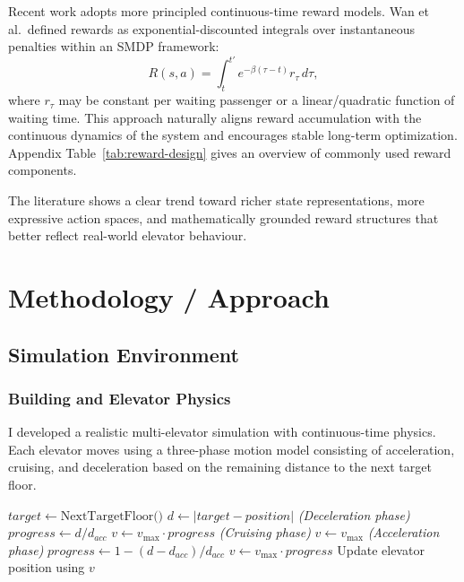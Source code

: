 \documentclass[10pt,twocolumn]{article}
\begin{document}
Recent work adopts more principled continuous-time reward models. Wan et al.\ defined rewards as exponential-discounted integrals over instantaneous penalties within an SMDP framework:
\[
R(s, a) = \int_{t}^{t'} e^{-\beta (\tau - t)} r_{\tau} \, d\tau,
\]
where $r_{\tau}$ may be constant per waiting passenger or a linear/quadratic function of waiting time\cite{WAN2024}. This approach naturally aligns reward accumulation with the continuous dynamics of the system and encourages stable long-term optimization. Appendix Table~\ref{tab:reward-design} gives an overview of commonly used reward components.

The literature shows a clear trend toward richer state representations, more expressive action spaces, and mathematically grounded reward structures that better reflect real-world elevator behaviour.

\section{Methodology / Approach}

\subsection{Simulation Environment}

\subsubsection{Building and Elevator Physics}

I developed a realistic multi-elevator simulation with continuous-time physics.  
Each elevator moves using a three-phase motion model consisting of acceleration, cruising, and deceleration based on the remaining distance to the next target floor.

\begin{algorithm}[h!]
\caption{Elevator Motion With Physics}
\begin{algorithmic}[1]
\State $target \gets \text{NextTargetFloor()}$
\State $d \gets |target - position|$
    \State \textit{(Deceleration phase)}
    \State $progress \gets d / d_{acc}$
    \State $v \gets v_{\max} \cdot progress$
    \State \textit{(Cruising phase)}
    \State $v \gets v_{\max}$
\Else
    \State \textit{(Acceleration phase)}
    \State $progress \gets 1 - (d - d_{acc}) / d_{acc}$
    \State $v \gets v_{\max} \cdot progress$
\EndIf
\State Update elevator position using $v$
\end{algorithmic}
\end{algorithm}
\end{document}
